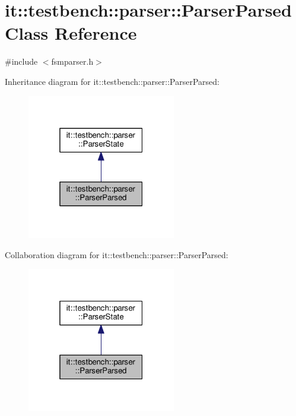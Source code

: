 \hypertarget{classit_1_1testbench_1_1parser_1_1ParserParsed}{\section{it\-:\-:testbench\-:\-:parser\-:\-:Parser\-Parsed Class Reference}
\label{dc/d96/classit_1_1testbench_1_1parser_1_1ParserParsed}
}


{\ttfamily \#include $<$fsmparser.\-h$>$}



Inheritance diagram for it\-:\-:testbench\-:\-:parser\-:\-:Parser\-Parsed\-:
\nopagebreak
\begin{figure}[H]
\begin{center}
\leavevmode
\includegraphics[width=184pt]{d0/d38/classit_1_1testbench_1_1parser_1_1ParserParsed__inherit__graph}
\end{center}
\end{figure}


Collaboration diagram for it\-:\-:testbench\-:\-:parser\-:\-:Parser\-Parsed\-:
\nopagebreak
\begin{figure}[H]
\begin{center}
\leavevmode
\includegraphics[width=184pt]{d2/d71/classit_1_1testbench_1_1parser_1_1ParserParsed__coll__graph}
\end{center}
\end{figure}
